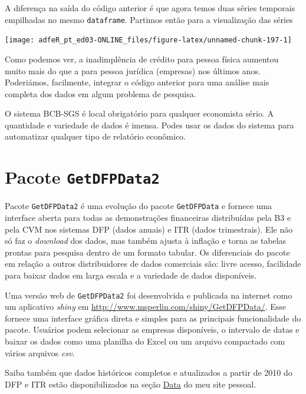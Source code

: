 \documentclass[
  11pt,
]{book}
\newenvironment{rmdimportant}
{\begin{importantblock}

	} {\end{importantblock}}
\begin{document}
A diferença na saída do código anterior é que agora temos duas séries temporais empilhadas no mesmo \texttt{dataframe}. Partimos então para a visualização das séries

\begin{center}\texttt{[image: adfeR\_pt\_ed03-ONLINE\_files/figure-latex/unnamed-chunk-197-1]} \end{center}

Como podemos ver, a inadimplência de crédito para pessoa física aumentou muito mais do que a para pessoa jurídica (empresas) nos últimos anos. Poderiámos, facilmente, integrar o código anterior para uma análise mais completa dos dados em algum problema de pesquisa.

\begin{rmdimportant}
O sistema BCB-SGS é local obrigatório para qualquer economista sério. A
quantidade e variedade de dados é imensa. Podes usar os dados do sistema
para automatizar qualquer tipo de relatório econômico.
\end{rmdimportant}

\hypertarget{pacote-getdfpdata2}{%
\section{\texorpdfstring{Pacote \texttt{GetDFPData2}}{Pacote GetDFPData2}}\label{pacote-getdfpdata2}}

Pacote \texttt{GetDFPData2} \citep{R-GetDFPData2} é uma evolução do pacote \texttt{GetDFPData} \citep{R-GetDFPData} e fornece uma interface aberta para todas as demonstrações financeiras distribuídas pela B3 e pela CVM nos sistemas DFP (dados anuais) e ITR (dados trimestrais). Ele não só faz o \emph{download} dos dados, mas também ajusta à inflação e torna as tabelas prontas para pesquisa dentro de um formato tabular. Os diferenciais do pacote em relação a outros distribuidores de dados comerciais são: livre acesso, facilidade para baixar dados em larga escala e a variedade de dados disponíveis.

\begin{rmdimportant}
Uma versão web de \texttt{GetDFPData2} foi desenvolvida e publicada na
internet como um aplicativo \emph{shiny} em
\url{http://www.msperlin.com/shiny/GetDFPData/}. Esse fornece uma
interface gráfica direta e simples para as principais funcionalidade do
pacote. Usuários podem selecionar as empresas disponíveis, o intervalo
de datas e baixar os dados como uma planilha do Excel ou um arquivo
compactado com vários arquivos \emph{csv}.

Saiba também que dados históricos completos e atualizados a partir de
2010 do DFP e ITR estão disponibilizados na seção
\href{https://www.msperlin.com/blog/data/}{Data} do meu site pessoal.
\end{rmdimportant}
\end{document}
